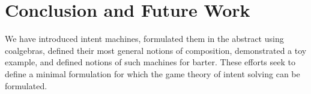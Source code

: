 \section{Conclusion and Future Work}\label{sec:conclusion}

We have introduced intent machines, formulated them in the abstract using coalgebras, defined their most general notions of composition, demonstrated a toy example, and defined notions of such machines for barter. These efforts seek to define a minimal formulation for which the game theory of intent solving can be formulated. 